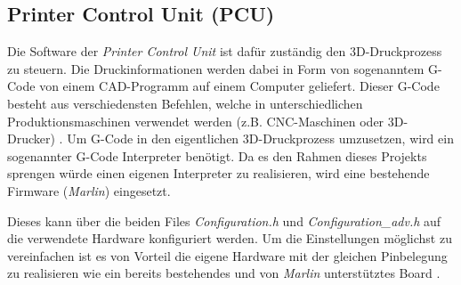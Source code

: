 \subsection{Printer Control Unit (PCU)}\label{subsec:PCU}
Die Software der \textit{Printer Control Unit} ist dafür zuständig den 3D-Druckprozess zu steuern. Die Druckinformationen werden dabei in Form von sogenanntem G-Code von einem CAD-Programm auf einem Computer geliefert. Dieser G-Code besteht aus verschiedensten Befehlen, welche in unterschiedlichen Produktionsmaschinen verwendet werden (z.B. CNC-Maschinen oder 3D-Drucker) \cite{G_Code_Tutorial}. Um G-Code in den eigentlichen 3D-Druckprozess umzusetzen, wird ein sogenannter G-Code Interpreter benötigt. Da es den Rahmen dieses Projekts sprengen würde einen eigenen Interpreter zu realisieren, wird eine bestehende Firmware (\textit{Marlin}) eingesetzt. 

Dieses kann über die beiden Files \textit{Configuration.h} und \textit{Configuration\_adv.h} auf die verwendete Hardware konfiguriert werden. Um die Einstellungen möglichst zu vereinfachen ist es von Vorteil die eigene Hardware mit der gleichen Pinbelegung zu realisieren wie ein bereits bestehendes und von \textit{Marlin} unterstütztes Board \cite{Marlin_Configuration}. 





